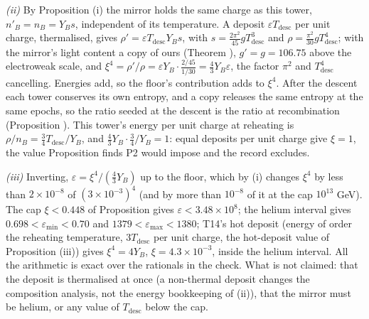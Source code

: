 \emph{(ii)} By Proposition (i) the mirror holds the same charge as this tower, $n'_{B} = n_{B} = Y_{B}s$, independent of its temperature. A deposit $\varepsilon T_{\mathrm{desc}}$ per unit charge, thermalised, gives $\rho' = \varepsilon T_{\mathrm{desc}}Y_{B}s$, with $s = \tfrac{2\pi^{2}}{45}gT_{\mathrm{desc}}^{3}$ and $\rho = \tfrac{\pi^{2}}{30}gT_{\mathrm{desc}}^{4}$; with the mirror's light content a copy of ours (Theorem ), $g' = g = 106.75$ above the electroweak scale, and $\xi^{4} = \rho'/\rho = \varepsilon Y_{B}\cdot\tfrac{2/45}{1/30} = \tfrac43 Y_{B}\varepsilon$, the factor $\pi^{2}$ and $T_{\mathrm{desc}}^{4}$ cancelling. Energies add, so the floor's contribution adds to $\xi^{4}$. After the descent each tower conserves its own entropy, and a copy releases the same entropy at the same epochs, so the ratio seeded at the descent is the ratio at recombination (Proposition ). This tower's energy per unit charge at reheating is $\rho/n_{B} = \tfrac34 T_{\mathrm{desc}}/Y_{B}$, and $\tfrac43 Y_{B}\cdot\tfrac34/Y_{B} = 1$: equal deposits per unit charge give $\xi = 1$, the value Proposition  finds P2 would impose and the record excludes.

\emph{(iii)} Inverting, $\varepsilon = \xi^{4}/(\tfrac43 Y_{B})$ up to the floor, which by (i) changes $\xi^{4}$ by less than $2 \times 10^{-8}$ of $(3 \times 10^{-3})^{4}$ (and by more than $10^{-8}$ of it at the cap $10^{13}$ GeV). The cap $\xi < 0.448$ of Proposition  gives $\varepsilon < 3.48 \times 10^{8}$; the helium interval gives $0.698 < \varepsilon_{\min} < 0.70$ and $1379 < \varepsilon_{\max} < 1380$; T14's hot deposit (energy of order the reheating temperature, $3T_{\mathrm{desc}}$ per unit charge, the hot-deposit value of Proposition (iii)) gives $\xi^{4} = 4Y_{B}$, $\xi = 4.3 \times 10^{-3}$, inside the helium interval. All the arithmetic is exact over the rationals in the check. What is not claimed: that the deposit is thermalised at once (a non-thermal deposit changes the composition analysis, not the energy bookkeeping of (ii)), that the mirror must be helium, or any value of $T_{\mathrm{desc}}$ below the cap.

